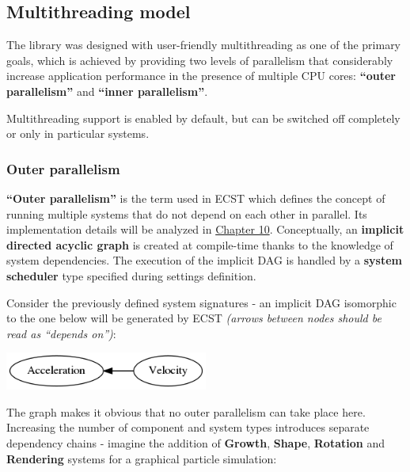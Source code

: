 \documentclass[twoside, 12pt, a4paper, openany]{book}
\let\origfigure=\figure
\let\endorigfigure=\endfigure
\renewenvironment{figure}[1][]{%
\origfigure[H]
}{%
\endorigfigure
}
\begin{document}
\subsection{Multithreading model}\label{multithreading-model}

The library was designed with user-friendly multithreading as one of the
primary goals, which is achieved by providing two levels of parallelism
that considerably increase application performance in the presence of
multiple CPU cores: \textbf{``outer parallelism''} and \textbf{``inner
parallelism''}.

Multithreading support is enabled by default, but can be switched off
completely or only in particular systems.

\hypertarget{overview_outer_parallelism_dag}{\subsubsection{Outer
parallelism}\label{overview_outer_parallelism_dag}}

\textbf{``Outer parallelism''} is the term used in ECST which defines
the concept of running multiple systems that do not depend on each other
in parallel. Its implementation details will be analyzed in
\protect\hyperlink{multithreading_system_scheduling}{Chapter 10}.
Conceptually, an \textbf{implicit directed acyclic graph} is created at
compile-time thanks to the knowledge of system dependencies. The
execution of the implicit DAG is handled by a \textbf{system scheduler}
type specified during settings definition.

Consider the previously defined system signatures - an implicit DAG
isomorphic to the one below will be generated by ECST \emph{(arrows
between nodes should be read as ``depends on'')}:

\begin{figure}[htbp]
\centering
\includegraphics[width=0.50000\textwidth]{source/figures/generated/ecst/overview/multithreading/outer/dag0.png}
\caption{ECST multithreading: example outer parallelism DAG \#0}
\end{figure}

The graph makes it obvious that no outer parallelism can take place
here. Increasing the number of component and system types introduces
separate dependency chains - imagine the addition of \textbf{Growth},
\textbf{Shape}, \textbf{Rotation} and \textbf{Rendering} systems for a
graphical particle simulation:
\end{document}
